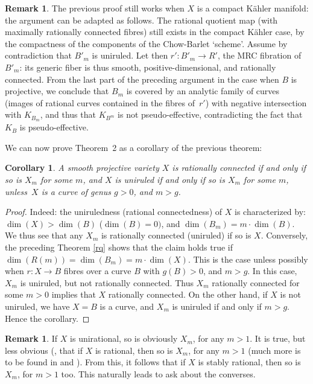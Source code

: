 \documentclass[JEP,XML,SOM,Unicode, NoEqCountersInSection,NoFloatCountersInSection,published]{cedram}
\theoremstyle{theorem}
\newtheorem{corollary}[proposition]{Corollary}
\theoremstyle{definition}
\newtheorem{remark}[proposition]{Remark}
\begin{document}
\begin{remark}
The previous proof still works when \(X\) is a compact Kähler manifold: the argument can be adapted as follows. The rational quotient map (with maximally rationally connected fibres) still exists in the compact Kähler case, by the compactness of the components of the Chow-Barlet `scheme'. Assume by contradiction that $B'_m$ is uniruled. Let then $r':B'_m\to R'$, the MRC fibration of $B'_m$: its generic fiber is thus smooth, positive-dimensional, and rationally connected. From the last part of the preceding argument in the case when $B$ is projective, we conclude that $B_m$ is covered by an analytic family of curves (images of rational curves contained in the fibres of~$r'$) with negative intersection with $K_{B_m}$, and thus that $K_{B^m}$ is not pseudo-effective, contradicting the fact that $K_B$ is pseudo-effective.
\end{remark}

We can now prove Theorem~2 as a corollary of the previous theorem:

\begin{corollary} \label{cor:uniruled} A smooth projective variety $X$ is rationally connected if and only if so is $X_m$ for some $m$, and $X$ is uniruled if and only if so is $X_m$ for some $m$, unless~$X$ is a curve of genus $g>0$, and $m>g$. \end{corollary}

\begin{proof} Indeed: the uniruledness (\resp rational connectedness) of $X$ is characterized by: $\dim(X)>\dim(B)$ (\resp $\dim(B)=0)$, and $\dim(B_m)=m\cdot \dim(B)$. We thus see that any $X_m$ is rationally connected (\resp uniruled) if so is $X$. Conversely, the preceding Theorem \ref{rq} shows that the claim holds true if $\dim(R(m))=\dim(B_m)=m\cdot \dim(X)$. This is the case unless possibly when $r:X\to B$ fibres over a curve $B$ with $g(B)>0$, and $m> g$. In this case, $X_m$ is uniruled, but not rationally connected. Thus $X_m$ rationally connected for some $m>0$ implies that $X$ rationally connected. On the other hand, if $X$ is not uniruled, we have $X=B$ is a curve, and $X_m$ is uniruled if and only if $m>g$. Hence the corollary.\end{proof}

\begin{remark} If $X$ is unirational, so is obviously $X_m$, for any $m>1$. It is true, but less obvious (\cite{mat68}, that if $X$ is rational, then so is $X_m$, for any $m>1$ (much more is to be found in \cite{CT-S} and \cite{Pop}). From this, it follows that if $X$ is stably rational, then so is $X_m$, for $m>1$ too. This naturally leads to ask about the converses.
\end{remark}
\end{document}
